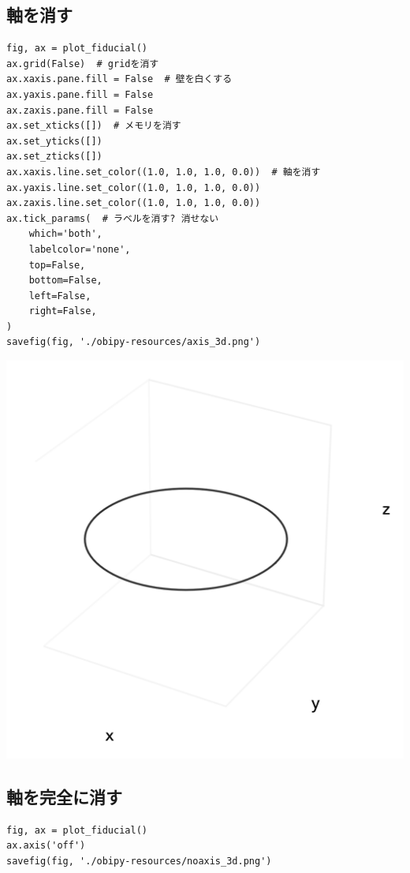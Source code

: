 \documentclass[a4paper, 10pt, notitlepage, twocolumn, uplatex, oneside, dvipdfmx]{jsarticle}
\begin{document}
\subsection{軸を消す}
\label{sec:org94a5ab7}
\begin{verbatim}
fig, ax = plot_fiducial()
ax.grid(False)  # gridを消す
ax.xaxis.pane.fill = False  # 壁を白くする
ax.yaxis.pane.fill = False
ax.zaxis.pane.fill = False
ax.set_xticks([])  # メモリを消す
ax.set_yticks([])
ax.set_zticks([])
ax.xaxis.line.set_color((1.0, 1.0, 1.0, 0.0))  # 軸を消す
ax.yaxis.line.set_color((1.0, 1.0, 1.0, 0.0))
ax.zaxis.line.set_color((1.0, 1.0, 1.0, 0.0))
ax.tick_params(  # ラベルを消す? 消せない
    which='both',
    labelcolor='none',
    top=False,
    bottom=False,
    left=False,
    right=False,
)
savefig(fig, './obipy-resources/axis_3d.png')
\end{verbatim}

\label{}
\begin{center}
\includegraphics[width=1.0\linewidth]{./obipy-resources/axis_3d.png}
\end{center}
\subsection{軸を完全に消す}
\label{sec:org9210358}
\begin{verbatim}
fig, ax = plot_fiducial()
ax.axis('off')
savefig(fig, './obipy-resources/noaxis_3d.png')
\end{verbatim}
\end{document}
